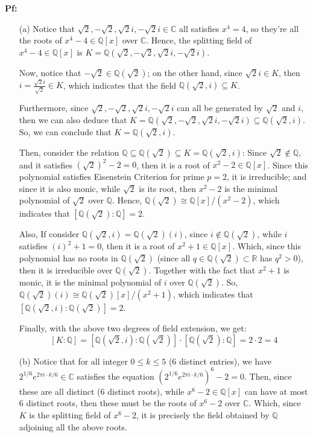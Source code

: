 \documentclass{article}
\begin{document}
\textbf{Pf:}
\begin{itemize}
    \item[(a)] Notice that $\sqrt{2},-\sqrt{2},\sqrt{2}i,-\sqrt{2}i\in\mathbb{C}$ all satisfies $x^4 = 4$, so they're all the roots of $x^4-4\in\mathbb{Q}[x]$ over $\mathbb{C}$. Hence, the splitting field of $x^4-4\in\mathbb{Q}[x]$ is $K=\mathbb{Q}(\sqrt{2},-\sqrt{2},\sqrt{2}i,-\sqrt{2}i)$.
    
    Now, notice that $-\sqrt{2}\in \mathbb{Q}(\sqrt{2})$; on the other hand, since $\sqrt{2}i\in K$, then $i=\frac{\sqrt{2}i}{\sqrt{2}} \in K$, which indicates that the field $\mathbb{Q}(\sqrt{2},i)\subseteq K$.

    Furthermore, since $\sqrt{2},-\sqrt{2},\sqrt{2}i,-\sqrt{2}i$ can all be generated by $\sqrt{2}$ and $i$, then we can also deduce that $K=\mathbb{Q}(\sqrt{2},-\sqrt{2},\sqrt{2}i,-\sqrt{2}i)\subseteq \mathbb{Q}(\sqrt{2},i)$. So, we can conclude that $K=\mathbb{Q}(\sqrt{2},i)$.

    Then, consider the relation $\mathbb{Q}\subseteq \mathbb{Q}(\sqrt{2})\subseteq K=\mathbb{Q}(\sqrt{2},i)$: Since $\sqrt{2}\notin \mathbb{Q}$, and it satisfies $(\sqrt{2})^2-2 = 0$, then it is a root of $x^2-2\in\mathbb{Q}[x]$. Since this polynomial satisfies Eisenstein Criterion for prime $p=2$, it is irreducible; and since it is also monic, while $\sqrt{2}$ is its root, then $x^2-2$ is the minimal polynomial of $\sqrt{2}$ over $\mathbb{Q}$. Hence, $\mathbb{Q}(\sqrt{2})\cong \mathbb{Q}[x]/(x^2-2)$, which indicates that $[\mathbb{Q}(\sqrt{2}):\mathbb{Q}]=2$.

    Also, If consider $\mathbb{Q}(\sqrt{2},i)=\mathbb{Q}(\sqrt{2})(i)$, since $i\notin \mathbb{Q}(\sqrt{2})$, while $i$ satisfies $(i)^2+1 = 0$, then it is a root of $x^2+1\in\mathbb{Q}[x]$. Which, since this polynomial has no roots in $\mathbb{Q}(\sqrt{2})$ (since all $q\in\mathbb{Q}(\sqrt{2})\subset\mathbb{R}$ has $q^2>0$), then it is irreducible over $\mathbb{Q}(\sqrt{2})$. Together with the fact that $x^2+1$ is monic, it is the minimal polynomial of $i$ over $\mathbb{Q}(\sqrt{2})$. So, $\mathbb{Q}(\sqrt{2})(i)\cong \mathbb{Q}(\sqrt{2})[x]/(x^2+1)$, which indicates that $[\mathbb{Q}(\sqrt{2},i):\mathbb{Q}(\sqrt{2})]=2$.

    Finally, with the above two degrees of field extension, we get:
    $$[K:\mathbb{Q}] = [\mathbb{Q}(\sqrt{2},i):\mathbb{Q}(\sqrt{2})]\cdot [\mathbb{Q}(\sqrt{2}):\mathbb{Q}] = 2\cdot 2 = 4$$

    \hfil

    \item[(b)] Notice that for all integer $0\leq k\leq 5$ ($6$ distinct entries), we have $2^{1/6}e^{2\pi i\cdot k/6}\in\mathbb{C}$ satisfies the equation $(2^{1/6}e^{2\pi i\cdot k/6})^6 -2 = 0$. Then, since these are all distinct ($6$ distinct roots), while $x^6-2\in\mathbb{Q}[x]$ can have at most $6$ distinct roots, then these must be the roots of $x^6-2$ over $\mathbb{C}$. Which, since $K$ is the splitting field of $x^6-2$, it is precisely the field obtained by $\mathbb{Q}$ adjoining all the above roots.
    

\end{itemize}
\end{document}
